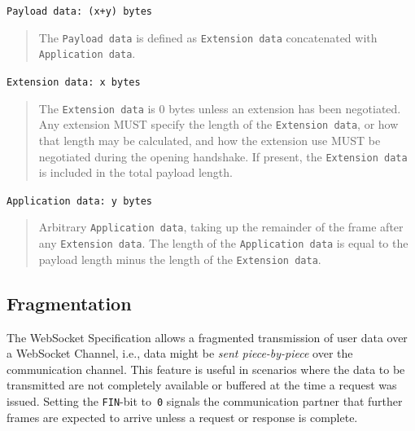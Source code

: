 \documentclass[a4paper, justified, notoc]{tufte-handout} %
\begin{document}
\noindent   \texttt{Payload data:  (x+y) bytes}
\begin{quote}
      The \texttt{Payload data} is defined as \texttt{Extension data} concatenated
      with \texttt{Application data}.
\end{quote}

\noindent   \texttt{Extension data:  x bytes}
\begin{quote}
      The \texttt{Extension data} is 0 bytes unless an extension has been
      negotiated.  Any extension MUST specify the length of the
      \texttt{Extension data}, or how that length may be calculated, and how
      the extension use MUST be negotiated during the opening handshake.
      If present, the \texttt{Extension data} is included in the total payload
      length.
\end{quote}

\noindent   \texttt{Application data:  y bytes}
\begin{quote}
      Arbitrary \texttt{Application data}, taking up the remainder of the frame
      after any \texttt{Extension data}.  The length of the \texttt{Application data}
      is equal to the payload length minus the length of the \texttt{Extension data}.
\end{quote}


%




\subsection{Fragmentation} %
\label{sub:fragmentation}
The WebSocket Specification allows a fragmented transmission of user data over a WebSocket Channel, i.e., data might be \emph{sent piece-by-piece} over the communication channel. This feature is useful in scenarios where the data to be transmitted are not completely available or buffered at the time a request was issued. Setting the \texttt{FIN}-bit to~\texttt{0} signals the communication partner that further frames are expected to arrive unless a request or response is complete. 
\end{document}
